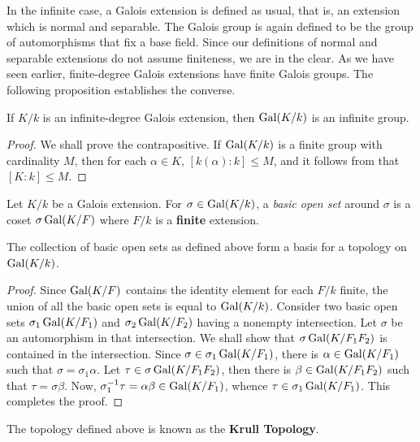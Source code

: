 In the infinite case, a Galois extension is defined as usual, that is, an extension which is normal and separable. The Galois group is again defined to be the group of automorphisms that fix a base field. Since our definitions of normal and separable extensions do not assume finiteness, we are in the clear. As we have seen earlier, finite-degree Galois extensions have finite Galois groups. The following proposition establishes the converse.

\begin{proposition}
    If $K/k$ is an infinite-degree Galois extension, then $\operatorname{Gal}(K/k)$ is an infinite group. 
\end{proposition}
\begin{proof}
    We shall prove the contrapositive. If $\operatorname{Gal}(K/k)$ is a finite group with cardinality $M$, then for each $\alpha\in K$, $[k(\alpha):k]\le M$, and it follows from  that $[K:k]\le M$.
\end{proof}


\begin{definition}
    Let $K/k$ be a Galois extension. For $\sigma\in\operatorname{Gal}(K/k)$, a \textit{basic open set} around $\sigma$ is a coset $\sigma\operatorname{Gal}(K/F)$ where $F/k$ is a \textbf{finite} extension.
\end{definition}

\begin{proposition}
    The collection of basic open sets as defined above form a basis for a topology on $\operatorname{Gal}(K/k)$.
\end{proposition}
\begin{proof}
    Since $\operatorname{Gal}(K/F)$ contains the identity element for each $F/k$ finite, the union of all the basic open sets is equal to $\operatorname{Gal}(K/k)$. Consider two basic open sets $\sigma_1\operatorname{Gal}(K/F_1)$ and $\sigma_2\operatorname{Gal}(K/F_2)$ having a nonempty intersection. Let $\sigma$ be an automorphism in that intersection. We shall show that $\sigma\operatorname{Gal}(K/F_1F_2)$ is contained in the intersection. Since $\sigma\in\sigma_1\operatorname{Gal}(K/F_1)$, there is $\alpha\in\operatorname{Gal}(K/F_1)$ such that $\sigma = \sigma_1\alpha$. Let $\tau\in\sigma\operatorname{Gal}(K/F_1F_2)$, then there is $\beta\in\operatorname{Gal}(K/F_1F_2)$ such that $\tau = \sigma\beta$. Now, $\sigma_1^{-1}\tau = \alpha\beta\in\operatorname{Gal}(K/F_1)$, whence $\tau\in\sigma_1\operatorname{Gal}(K/F_1)$. This completes the proof.
\end{proof}

The topology defined above is known as the \textbf{Krull Topology}.

